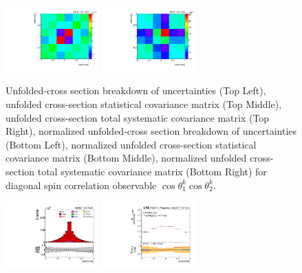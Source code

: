 \begin{refsection}
\begin{figure}[htb]
\begin{center}
 \includegraphics[width=0.32\textwidth]{fig_fullRun2UL/unfolding/combined/StatCovMatrixNorm_rebinnedB_c_kk.pdf}
 \includegraphics[width=0.32\textwidth]{fig_fullRun2UL/unfolding/combined/TotalSystCovMatrixNorm_rebinnedB_c_kk.pdf} \\
\caption{Unfolded-cross section breakdown of uncertainties (Top Left), unfolded cross-section statistical covariance matrix (Top Middle), unfolded cross-section total systematic covariance matrix (Top Right), normalized unfolded-cross section breakdown of uncertainties (Bottom Left), normalized unfolded cross-section statistical covariance matrix (Bottom Middle), normalized unfolded cross-section total systematic covariance matrix (Bottom Right) for diagonal spin correlation observable $\cos\theta_{1}^{k}\cos\theta_{2}^{k}$.}
\label{fig:c_kk_uncertainties}
\end{center}
\end{figure}
\clearpage
\begin{figure}[htb]
\begin{center}
 \includegraphics[width=0.32\textwidth]{fig_fullRun2UL/controlplots/combined/Hyp_LLBarCrr.pdf}
 \includegraphics[width=0.32\textwidth]{fig_fullRun2UL/unfolding/combined/UnfoldedResults_c_rr.pdf}

\end{center}
\end{figure}
\end{refsection}
